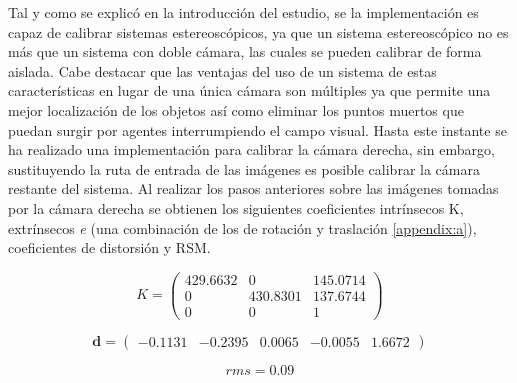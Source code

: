 \documentclass[a4paper,12pt]{article}
\begin{document}
{\vspace{0.5cm}

Tal y como se explicó en la introducción del estudio, se la implementación es capaz de calibrar sistemas estereoscópicos, ya que un sistema estereoscópico no es más que un sistema con doble cámara, las cuales se pueden calibrar de forma aislada. Cabe destacar que las ventajas del uso de un sistema de estas características en lugar de una única cámara son múltiples ya que permite una mejor localización de los objetos así como eliminar los puntos muertos que puedan surgir por agentes interrumpiendo el campo visual. Hasta este instante se ha realizado una implementación para calibrar la cámara derecha, sin embargo, sustituyendo la ruta de entrada de las imágenes es posible calibrar la cámara restante del sistema. Al realizar los pasos anteriores sobre las imágenes tomadas por la cámara derecha se obtienen los siguientes coeficientes intrínsecos K, extrínsecos \textit{e} (una combinación de los de rotación y traslación \ref{appendix:a}), coeficientes de distorsión y RSM.

\[
K = \begin{pmatrix}
429.6632 & 0 & 145.0714 \\
0 & 430.8301 & 137.6744 \\
0 & 0 & 1
\end{pmatrix}
\]

\[
\mathbf{d} = \begin{pmatrix}
-0.1131 & -0.2395 & 0.0065 & -0.0055 & 1.6672
\end{pmatrix}
\]

$$rms = 0.09$$

}
\end{document}

